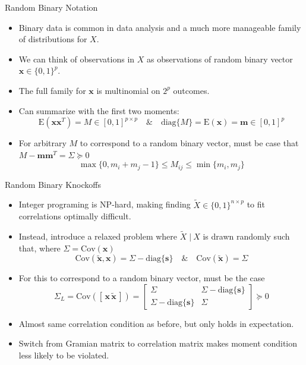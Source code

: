 \documentclass{beamer}
\newcommand{\E}{\mathrm{E}}
\newcommand{\cov}{\mathrm{Cov}}
\newcommand{\st}{ \; \big | \:}
\newcommand{\diag}[1]{\mathrm{diag}\{#1\}}
\begin{document}
\begin{frame}{Random Binary Notation}
    \begin{itemize}
        \item Binary data is common in data analysis and a much more manageable family of distributions for $X$.
        \item We can think of observations in $X$ as observations of random binary vector $\mathbf x\in\{0,1\}^p$.
        \item The full family for $\mathbf x$ is multinomial on $2^p$ outcomes.
        \item Can summarize with the first two moments: 
            \[ \E(\mathbf{x}\mathbf{x}^T) = M \in [0,1]^{p\times p} \quad \& \quad \diag{M} = \E(\mathbf x) = \mathbf{m} \in [0,1]^p  \]
        \item For arbitrary $M$ to correspond to a random binary vector, must be case that $ M-\mathbf{m}\mathbf{m}^T = \Sigma \succeq0$
            \[\max\{0,m_i+m_j -1\} \leq M_{ij} \leq \min\{m_i,m_j\} \]

    \end{itemize}
\end{frame}

\begin{frame}{Random Binary Knockoffs}
    \begin{itemize}
        \item Integer programing is NP-hard, making finding $\tilde X\in\{0,1\}^{n\times p}$ to fit correlations optimally difficult. 
        \item Instead, introduce a relaxed problem where $\tilde X\st X$ is drawn randomly such that, where $\Sigma=\cov(\mathbf x)$
            \[ \cov(\mathbf{\tilde x}, \mathbf x) = \Sigma - \diag{\mathbf s} \quad \& \quad \cov(\mathbf{\tilde x}) = \Sigma \]
        \item For this to correspond to a random binary vector, must be the case
            \[ \Sigma_L =\cov([\,\mathbf x\,\mathbf{\tilde x}\,]) = \left[ \begin{array}{cc} \Sigma & \Sigma - \diag{\mathbf s} \\ \Sigma - \diag{\mathbf s} & \Sigma \end{array}\right] \succeq 0 \]
        \item Almost same correlation condition as before, but only holds in expectation.
        \item Switch from Gramian matrix to correlation matrix makes moment condition less likely to be violated. 
    \end{itemize}
\end{frame}
\end{document}
